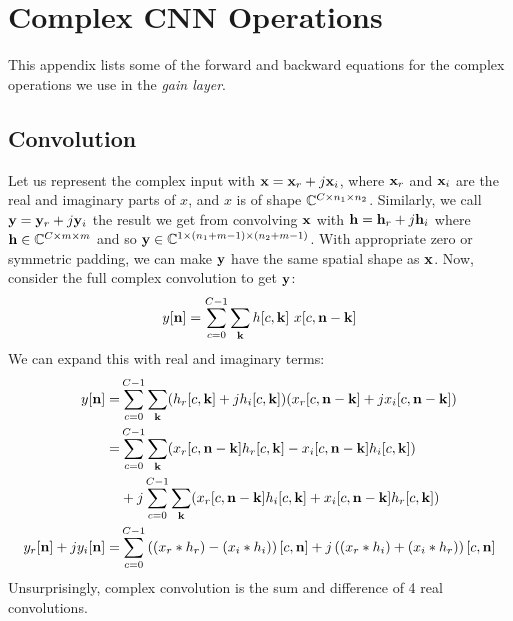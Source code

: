 \chapter{Complex CNN Operations}\label{app:ch6:complex_backprop}
\def \path {freqlearn/}
\def \imgpath {freqlearn/images}
This appendix lists some of the forward and backward equations for the
complex operations we use in the \emph{gain layer}.

\section{Convolution}\label{sec:appE:complex_conv}
\newcommand{\SigIn}{x}
\newcommand{\SigOut}{y}
\newcommand{\Filter}{h}
\newcommand{\SigInB}{\bmu{\SigIn}}
\newcommand{\SigOutB}{\bmu{\SigOut}}
\newcommand{\FilterB}{\bmu{\Filter}}
  
Let us represent the complex input with $\SigInB = \SigInB_r + j\SigInB_i$,
where $\SigInB_r$ and $\SigInB_i$ are the real and imaginary parts of $\SigIn$,
and $\SigIn$ is of shape $\complexes[C\x n_1\x n_2]$. Similarly, we call $\SigOutB =
\SigOutB_r + j\SigOutB_i$ the result we get from convolving $\SigInB$ with
$\FilterB= \FilterB_r + j\FilterB_i$ where $\FilterB \in \complexes[C\x m\x m]$ and so 
$\SigOutB \in \complexes[1 \x (n_1 + m - 1) \x (n_2 + m -1)]$. 
With appropriate zero or symmetric padding, we can make
$\SigOutB$ have the same spatial shape as $\SigInB$. Now, consider the full
complex convolution to get $\SigOutB$:
\begin{equation}
 \SigOut[\nn] = \sum_{c=0}^{C-1} \sum_{\kk} \Filter[c, \kk]\ \SigIn[c, \nn - \kk]
\end{equation}
We can expand this with real and imaginary terms:
\begin{align}
  \SigOut[\nn]  =&  \sum_{c=0}^{C-1} \sum_{\kk} (\Filter_r[c, \kk] +j\Filter_i[c, \kk]) 
        (\SigIn_r[c, \nn-\kk]+ j\SigIn_i[c, \nn - \kk]) \nonumber \\
  =&  \sum_{c=0}^{C-1} \sum_{\kk} (\SigIn_r[c, \nn - \kk] \Filter_r[c, \kk] - 
                                   \SigIn_i[c, \nn - \kk] \Filter_i[c, \kk]) \nonumber \\
   &+ j\sum_{c=0}^{C-1} \sum_{\kk} (\SigIn_r[c, \nn-\kk] \Filter_i[c, \kk] + 
          \SigIn_i[c, \nn - \kk] \Filter_r[c, \kk]) \nonumber\\
\SigOut_r[\nn] + j\SigOut_i[\nn]  =& \sum_{c=0}^{C-1} \left((\SigIn_r \ast \Filter_r) - (\SigIn_i \ast \Filter_i)\right)[c, \nn] + 
          j\left((\SigIn_r \ast \Filter_i) + (\SigIn_i \ast \Filter_r)\right)[c, \nn] \label{eq:app:complex_conv}
\end{align}
Unsurprisingly, complex convolution is the sum and difference of 4 real convolutions.


